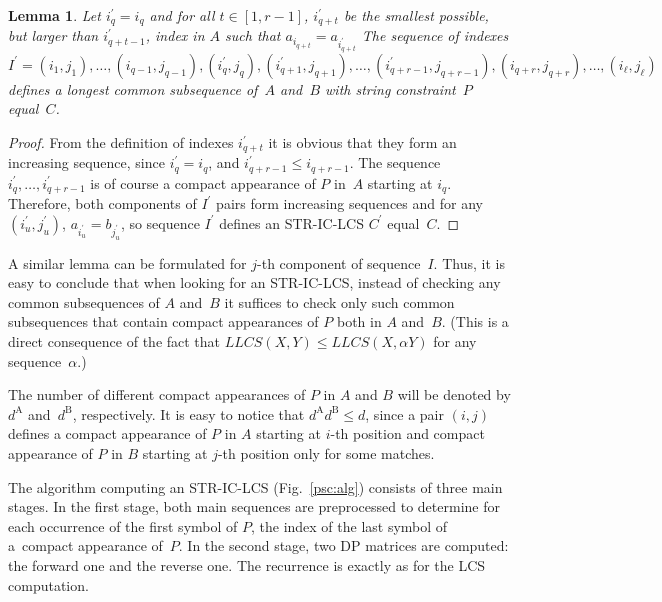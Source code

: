 \documentclass[12pt]{article}
\newtheorem{lemma}{Lemma}
\begin{document}
\begin{lemma}\label{lem:i-prime}
Let $i^\prime_q = i_q$ and for all $t \in [1, r-1]$, $i^\prime_{q+t}$ be the smallest possible, but larger than $i^\prime_{q+t-1}$, index in $A$ such that $a_{i_{q+t}} = a_{i^\prime_{q+t}}$
The sequence of indexes $I^\prime = (i_1, j_1), \ldots, (i_{q-1}, j_{q-1}),\allowbreak{} (i^\prime_q, j_q), (i^\prime_{q+1}, j_{q+1}), \ldots, (i^\prime_{q+r-1}, j_{q+r-1}), (i_{q+r}, j_{q+r}), \ldots, (i_\ell, j_\ell)$ defines a longest common subsequence of~$A$ and~$B$ with string constraint~$P$ equal~$C$.
\end{lemma}

\begin{proof}
From the definition of indexes $i^\prime_{q+t}$ it is obvious that they form an increasing sequence, since $i^\prime_q = i_q$, and $i^\prime_{q+r-1} \le i_{q+r-1}$.
The sequence $i^\prime_{q}, \ldots, i^\prime_{q+r-1}$ is of course a compact appearance of $P$ in~$A$ starting at $i_q$.
Therefore, both components of $I^\prime$ pairs form increasing sequences and for any $(i^\prime_u, j^\prime_u)$, $a_{i^\prime_u} = b_{j^\prime_u}$, so sequence $I^\prime$ defines an STR-IC-LCS $C^\prime$ equal~$C$.
\end{proof}

A similar lemma can be formulated for $j$-th component of sequence~$I$.
Thus, it is easy to conclude that when looking for an STR-IC-LCS, instead of checking any common subsequences of $A$ and~$B$ it suffices to check only such common subsequences that contain compact appearances of $P$ both in $A$ and~$B$.
(This is a direct consequence of the fact that $\mathit{LLCS}(X, Y) \le \mathit{LLCS}(X, \alpha Y)$ for any sequence~$\alpha$.)

The number of different compact appearances of $P$ in $A$ and $B$ will be denoted by $d^\text{A}$ and~$d^\text{B}$, respectively.
It is easy to notice that $d^\text{A} d^\text{B} \le d$, since a pair $(i, j)$ defines a compact appearance of $P$ in $A$ starting at $i$-th position and compact appearance of $P$ in $B$ starting at $j$-th position only for some matches.

The algorithm computing an STR-IC-LCS (Fig.~\ref{psc:alg}) consists of three main stages.
In the first stage, both main sequences are preprocessed to determine for each occurrence of the first symbol of $P$, the index of the last symbol of a~compact appearance of~$P$.
In the second stage, two DP matrices are computed: the forward one and the reverse one.
The recurrence is exactly as for the LCS computation.
\end{document}
